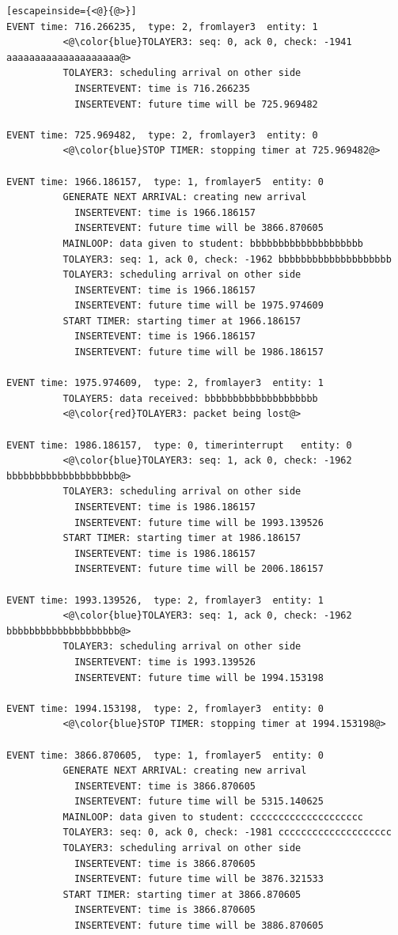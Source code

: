 \documentclass[paper=a4, fontsize=11pt]{scrartcl}
\numberwithin{equation}{section}		%
\numberwithin{figure}{section}			%
\numberwithin{table}{section}				%
\begin{document}
\begin{lstlisting}[escapeinside={<@}{@>}]
EVENT time: 716.266235,  type: 2, fromlayer3  entity: 1
          <@\color{blue}TOLAYER3: seq: 0, ack 0, check: -1941 aaaaaaaaaaaaaaaaaaaa@>
          TOLAYER3: scheduling arrival on other side
            INSERTEVENT: time is 716.266235
            INSERTEVENT: future time will be 725.969482

EVENT time: 725.969482,  type: 2, fromlayer3  entity: 0
          <@\color{blue}STOP TIMER: stopping timer at 725.969482@>

EVENT time: 1966.186157,  type: 1, fromlayer5  entity: 0
          GENERATE NEXT ARRIVAL: creating new arrival
            INSERTEVENT: time is 1966.186157
            INSERTEVENT: future time will be 3866.870605
          MAINLOOP: data given to student: bbbbbbbbbbbbbbbbbbbb
          TOLAYER3: seq: 1, ack 0, check: -1962 bbbbbbbbbbbbbbbbbbbb
          TOLAYER3: scheduling arrival on other side
            INSERTEVENT: time is 1966.186157
            INSERTEVENT: future time will be 1975.974609
          START TIMER: starting timer at 1966.186157
            INSERTEVENT: time is 1966.186157
            INSERTEVENT: future time will be 1986.186157

EVENT time: 1975.974609,  type: 2, fromlayer3  entity: 1
          TOLAYER5: data received: bbbbbbbbbbbbbbbbbbbb
          <@\color{red}TOLAYER3: packet being lost@>

EVENT time: 1986.186157,  type: 0, timerinterrupt   entity: 0
          <@\color{blue}TOLAYER3: seq: 1, ack 0, check: -1962 bbbbbbbbbbbbbbbbbbbb@>
          TOLAYER3: scheduling arrival on other side
            INSERTEVENT: time is 1986.186157
            INSERTEVENT: future time will be 1993.139526
          START TIMER: starting timer at 1986.186157
            INSERTEVENT: time is 1986.186157
            INSERTEVENT: future time will be 2006.186157

EVENT time: 1993.139526,  type: 2, fromlayer3  entity: 1
          <@\color{blue}TOLAYER3: seq: 1, ack 0, check: -1962 bbbbbbbbbbbbbbbbbbbb@>
          TOLAYER3: scheduling arrival on other side
            INSERTEVENT: time is 1993.139526
            INSERTEVENT: future time will be 1994.153198

EVENT time: 1994.153198,  type: 2, fromlayer3  entity: 0
          <@\color{blue}STOP TIMER: stopping timer at 1994.153198@>

EVENT time: 3866.870605,  type: 1, fromlayer5  entity: 0
          GENERATE NEXT ARRIVAL: creating new arrival
            INSERTEVENT: time is 3866.870605
            INSERTEVENT: future time will be 5315.140625
          MAINLOOP: data given to student: cccccccccccccccccccc
          TOLAYER3: seq: 0, ack 0, check: -1981 cccccccccccccccccccc
          TOLAYER3: scheduling arrival on other side
            INSERTEVENT: time is 3866.870605
            INSERTEVENT: future time will be 3876.321533
          START TIMER: starting timer at 3866.870605
            INSERTEVENT: time is 3866.870605
            INSERTEVENT: future time will be 3886.870605


\end{lstlisting}
\end{document}
